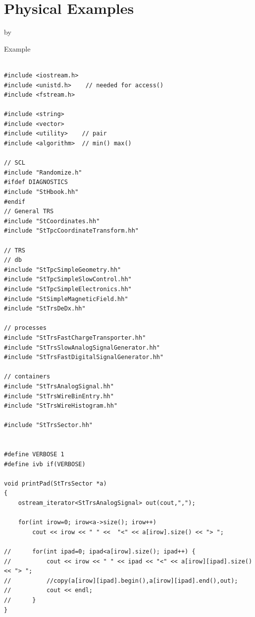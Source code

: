 \documentclass[twoside]{article}
\newcommand{\entrylabel}[1]{\mbox{\textbf{{#1}}}\hfil}%
\newenvironment{entry}
{\begin{list}{}%
    {\renewcommand{\makelabel}{\entrylabel}%
     \setlength{\labelwidth}{90pt}%
     \setlength{\leftmargin}{\labelwidth}
     \advance\leftmargin by \labelsep%
      }%
    }%
  {\end{list}}
\newcommand{\Entrylabel}[1]%
{\raisebox{0pt}[1ex][0pt]{\makebox[\labelwidth][l]%
    {\parbox[t]{\labelwidth}{\hspace{0pt}\textbf{{#1}}}}}}
\newenvironment{Entry}%
{\renewcommand{\entrylabel}{\Entrylabel}\begin{entry}}%
  {\end{entry}}
\begin{document}
\section{Physical Examples}
\label{sec:physicalExamples}

\begin{Entry}
\item[Example]

{\footnotesize
\begin{verbatim}

#include <iostream.h>
#include <unistd.h>    // needed for access()
#include <fstream.h>

#include <string>
#include <vector>
#include <utility>    // pair
#include <algorithm>  // min() max()

// SCL
#include "Randomize.h"
#ifdef DIAGNOSTICS
#include "StHbook.hh"
#endif
// General TRS
#include "StCoordinates.hh"
#include "StTpcCoordinateTransform.hh"

// TRS
// db
#include "StTpcSimpleGeometry.hh"
#include "StTpcSimpleSlowControl.hh"
#include "StTpcSimpleElectronics.hh"
#include "StSimpleMagneticField.hh"
#include "StTrsDeDx.hh"

// processes
#include "StTrsFastChargeTransporter.hh"
#include "StTrsSlowAnalogSignalGenerator.hh"
#include "StTrsFastDigitalSignalGenerator.hh"

// containers
#include "StTrsAnalogSignal.hh"
#include "StTrsWireBinEntry.hh"
#include "StTrsWireHistogram.hh"

#include "StTrsSector.hh"


#define VERBOSE 1
#define ivb if(VERBOSE)

void printPad(StTrsSector *a)
{
    ostream_iterator<StTrsAnalogSignal> out(cout,",");
    
    for(int irow=0; irow<a->size(); irow++)
        cout << irow << " " <<  "<" << a[irow].size() << "> ";

//      for(int ipad=0; ipad<a[irow].size(); ipad++) {
//          cout << irow << " " << ipad << "<" << a[irow][ipad].size() << "> ";
//          //copy(a[irow][ipad].begin(),a[irow][ipad].end(),out);
//          cout << endl;
//      }
}


\end{verbatim}}
\end{Entry}
\end{document}
